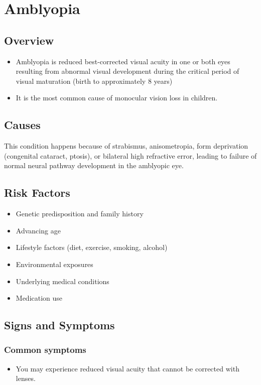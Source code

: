 \chapter{Amblyopia}
\label{sec:Amblyopia}

\section{Overview}


\begin{itemize}[noitemsep]
  \item Amblyopia is reduced best-corrected visual acuity in one or both eyes resulting from abnormal visual development during the critical period of visual maturation (birth to approximately 8 years)
  \item It is the most common cause of monocular vision loss in children.
\end{itemize}
\section{Causes}
This condition happens because of strabismus, anisometropia, form deprivation (congenital cataract, ptosis), or bilateral high refractive error, leading to failure of normal neural pathway development in the amblyopic eye.     
\section{Risk Factors}

\begin{itemize}[noitemsep]
  \item Genetic predisposition and family history
  \item Advancing age
  \item Lifestyle factors (diet, exercise, smoking, alcohol)
  \item Environmental exposures
  \item Underlying medical conditions
  \item Medication use
\end{itemize}
\section{Signs and Symptoms}

\subsection{Common symptoms}
\begin{itemize}[noitemsep]
  \item You may experience reduced visual acuity that cannot be corrected with lenses. 
  \end{itemize}

